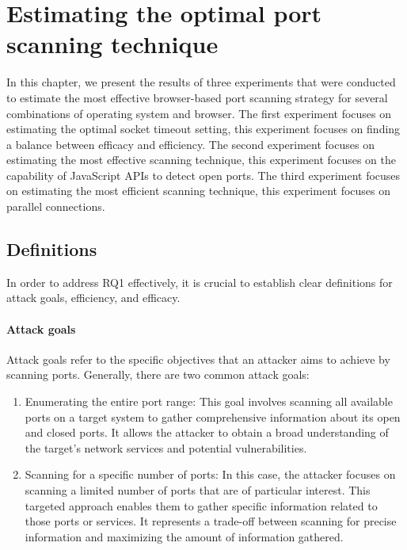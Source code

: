 \chapter{Estimating the optimal port scanning technique}
\label{chapter:scanning-techniques-experiment}

In this chapter, we present the results of three experiments that were conducted to estimate the most effective browser-based port scanning strategy for several combinations of operating system and browser. 
The first experiment focuses on estimating the optimal socket timeout setting, this experiment focuses on finding a balance between efficacy and efficiency.
The second experiment focuses on estimating the most effective scanning technique, this experiment focuses on the capability of JavaScript APIs to detect open ports.
The third experiment focuses on estimating the most efficient scanning technique, this experiment focuses on parallel connections.

\section{Definitions}

In order to address RQ1 effectively, it is crucial to establish clear definitions for attack goals, efficiency, and efficacy.

\subsubsection{Attack goals}

Attack goals refer to the specific objectives that an attacker aims to achieve by scanning ports. Generally, there are two common attack goals:

\begin{enumerate}[label=\alph*.]
    \item Enumerating the entire port range: This goal involves scanning all available ports on a target system to gather comprehensive information about its open and closed ports. It allows the attacker to obtain a broad understanding of the target's network services and potential vulnerabilities.
    
    \item Scanning for a specific number of ports: In this case, the attacker focuses on scanning a limited number of ports that are of particular interest. This targeted approach enables them to gather specific information related to those ports or services. It represents a trade-off between scanning for precise information and maximizing the amount of information gathered.
\end{enumerate}

